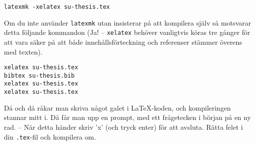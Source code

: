 \begin{verbatim}
latexmk -xelatex su-thesis.tex
\end{verbatim}

\noindent Om du inte använder \texttt{latexmk} utan insisterar på att kompilera
själv så motsvarar detta följande kommandon (Ja! -- \texttt{xelatex} behöver
vanligtvis köras tre gånger för att vara säker på att både innehållsförteckning
och referenser stämmer överens med texten).

\begin{verbatim}
xelatex su-thesis.tex
bibtex su-thesis.bib
xelatex su-thesis.tex
xelatex su-thesis.tex
\end{verbatim}

\noindent Då och då råkar man skriva något galet i \LaTeX-koden, och kompileringen
stannar mitt i. Då får man upp en prompt, med ett frågetecken i början på en ny
rad. -- När detta händer skriv 'x' (och tryck enter) för att avsluta. Rätta
felet i din \texttt{.tex}-fil och kompilera om.


